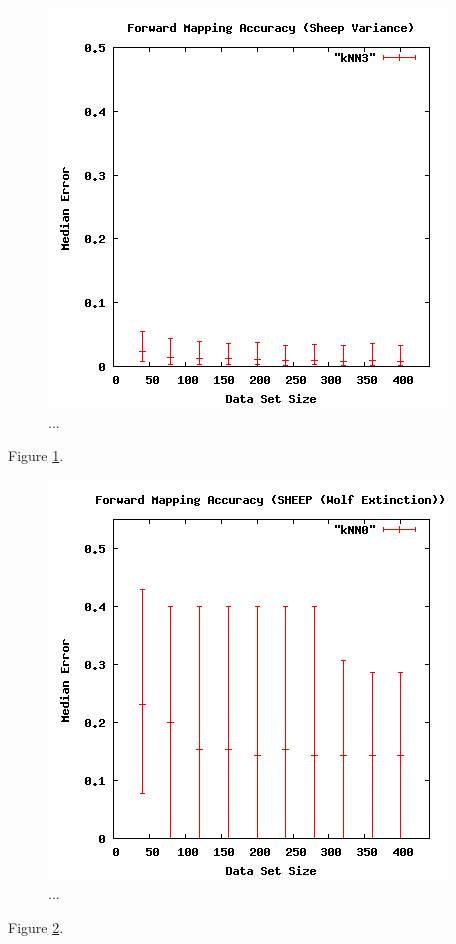 \begin{figure}[ht]
\centering
\includegraphics[scale=.5]{images/results_wolfsheep/fm-sheep-var.png}
\caption{...}
\label{fig:wolfsheepvar}
\end{figure}

Figure \ref{fig:wolfsheepvar}.

\begin{figure}[ht]
\centering
\includegraphics[scale=.5]{images/results_wolfsheep/fm-wolf-extict.png}
\caption{...}
\label{fig:wolfsheepextinct}
\end{figure}

Figure \ref{fig:wolfsheepextinct}.



